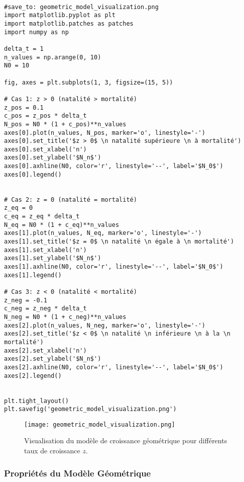 \documentclass{article}
\begin{document}
\begin{verbatim}

#save_to: geometric_model_visualization.png
import matplotlib.pyplot as plt
import matplotlib.patches as patches
import numpy as np

delta_t = 1
n_values = np.arange(0, 10)
N0 = 10

fig, axes = plt.subplots(1, 3, figsize=(15, 5))

# Cas 1: z > 0 (natalité > mortalité)
z_pos = 0.1
c_pos = z_pos * delta_t
N_pos = N0 * (1 + c_pos)**n_values
axes[0].plot(n_values, N_pos, marker='o', linestyle='-')
axes[0].set_title('$z > 0$ \n natalité supérieure \n à mortalité')
axes[0].set_xlabel('n')
axes[0].set_ylabel('$N_n$')
axes[0].axhline(N0, color='r', linestyle='--', label='$N_0$')
axes[0].legend()


# Cas 2: z = 0 (natalité = mortalité)
z_eq = 0
c_eq = z_eq * delta_t
N_eq = N0 * (1 + c_eq)**n_values
axes[1].plot(n_values, N_eq, marker='o', linestyle='-')
axes[1].set_title('$z = 0$ \n natalité \n égale à \n mortalité')
axes[1].set_xlabel('n')
axes[1].set_ylabel('$N_n$')
axes[1].axhline(N0, color='r', linestyle='--', label='$N_0$')
axes[1].legend()

# Cas 3: z < 0 (natalité < mortalité)
z_neg = -0.1
c_neg = z_neg * delta_t
N_neg = N0 * (1 + c_neg)**n_values
axes[2].plot(n_values, N_neg, marker='o', linestyle='-')
axes[2].set_title('$z < 0$ \n natalité \n inférieure \n à la \n mortalité')
axes[2].set_xlabel('n')
axes[2].set_ylabel('$N_n$')
axes[2].axhline(N0, color='r', linestyle='--', label='$N_0$')
axes[2].legend()


plt.tight_layout()
plt.savefig('geometric_model_visualization.png')
\end{verbatim}

\begin{figure}[h]
    \centering
    \texttt{[image: geometric\_model\_visualization.png]}
    \caption{Visualisation du modèle de croissance géométrique pour différents taux de croissance $z$.}
    \label{fig:geometric_model_visualization}
\end{figure}


\subsubsection{Propriétés du Modèle Géométrique}
\end{document}
